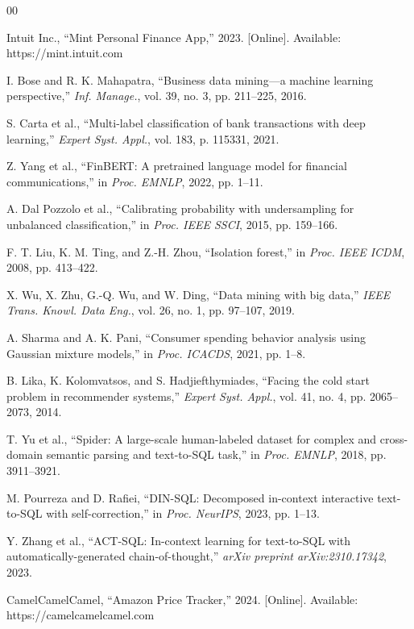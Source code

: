 \documentclass[]{IEEEtran}
\begin{document}
\begin{thebibliography}{00}

Intuit Inc., ``Mint Personal Finance App,'' 2023. [Online]. Available: https://mint.intuit.com

I. Bose and R. K. Mahapatra, ``Business data mining---a machine learning perspective,'' \textit{Inf. Manage.}, vol. 39, no. 3, pp. 211--225, 2016.

S. Carta et al., ``Multi-label classification of bank transactions with deep learning,'' \textit{Expert Syst. Appl.}, vol. 183, p. 115331, 2021.

Z. Yang et al., ``FinBERT: A pretrained language model for financial communications,'' in \textit{Proc. EMNLP}, 2022, pp. 1--11.

A. Dal Pozzolo et al., ``Calibrating probability with undersampling for unbalanced classification,'' in \textit{Proc. IEEE SSCI}, 2015, pp. 159--166.

F. T. Liu, K. M. Ting, and Z.-H. Zhou, ``Isolation forest,'' in \textit{Proc. IEEE ICDM}, 2008, pp. 413--422.

X. Wu, X. Zhu, G.-Q. Wu, and W. Ding, ``Data mining with big data,'' \textit{IEEE Trans. Knowl. Data Eng.}, vol. 26, no. 1, pp. 97--107, 2019.

A. Sharma and A. K. Pani, ``Consumer spending behavior analysis using Gaussian mixture models,'' in \textit{Proc. ICACDS}, 2021, pp. 1--8.

B. Lika, K. Kolomvatsos, and S. Hadjiefthymiades, ``Facing the cold start problem in recommender systems,'' \textit{Expert Syst. Appl.}, vol. 41, no. 4, pp. 2065--2073, 2014.

T. Yu et al., ``Spider: A large-scale human-labeled dataset for complex and cross-domain semantic parsing and text-to-SQL task,'' in \textit{Proc. EMNLP}, 2018, pp. 3911--3921.

M. Pourreza and D. Rafiei, ``DIN-SQL: Decomposed in-context interactive text-to-SQL with self-correction,'' in \textit{Proc. NeurIPS}, 2023, pp. 1--13.

Y. Zhang et al., ``ACT-SQL: In-context learning for text-to-SQL with automatically-generated chain-of-thought,'' \textit{arXiv preprint arXiv:2310.17342}, 2023.

CamelCamelCamel, ``Amazon Price Tracker,'' 2024. [Online]. Available: https://camelcamelcamel.com


\end{thebibliography}
\end{document}

